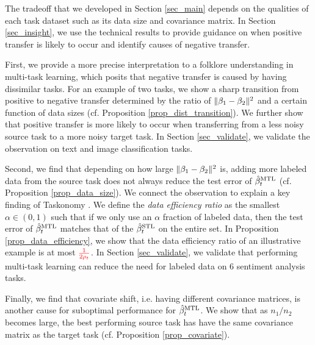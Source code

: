 
The tradeoff that we developed in Section \ref{sec_main} depends on the qualities of each task dataset such as its data size and covariance matrix.
In Section \ref{sec_insight}, we use the technical results to provide guidance on when positive transfer is likely to occur and identify causes of negative transfer.
\squishlist
		\item First, we provide a more precise interpretation to a folklore understanding in multi-task learning, which posits that negative transfer is caused by having dissimilar tasks.
		For an example of two tasks, we show a sharp transition from positive to negative transfer determined by the ratio of $\|\beta_1 - \beta_2\|^2$ and a certain function of data sizes (cf. Proposition \ref{prop_dist_transition}).
		We further show that positive transfer is more likely to occur when transferring from a less noisy source task to a more noisy target task.
		In Section \ref{sec_validate}, we validate the observation on text and image classification tasks.
		\item Second, we find that depending on how large $\|\beta_1 - \beta_2\|^2$ is, adding more labeled data from the source task does not always reduce the test error of $\hat{\beta}_t^{\text{MTL}}$ (cf. Proposition \ref{prop_data_size}).
	We connect the observation to explain a key finding of Taskonomy \cite{ZSSGM18}.
	We define the \textit{data efficiency ratio} as the smallest $\alpha\in(0, 1)$ such that if we only use an $\alpha$ fraction of labeled data, then the test error of $\hat{\beta}_t^{\text{MTL}}$ matches that of the $\hat{\beta}_t^{\text{STL}}$ on the entire set.
	In Proposition \ref{prop_data_efficiency}, we show that the data efficiency ratio of an illustrative example is at most $\textcolor{red}{\frac {1}{2\rho_t}}$.
	In Section \ref{sec_validate}, we validate that performing multi-task learning can reduce the need for labeled data on 6 sentiment analysis tasks. %
		\item Finally, we find that covariate shift, i.e. having different covariance matrices, is another cause for suboptimal performance for $\hat{\beta}_t^{\text{MTL}}$.
		We show that as $n_1 / n_2$ becomes large, the best performing source task has have the same covariance matrix as the target task (cf. Proposition \ref{prop_covariate}).
\squishend

